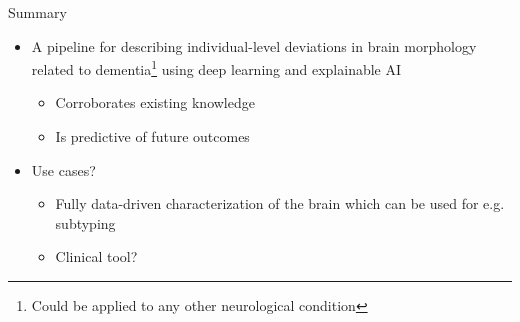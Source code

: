 \documentclass[t]{beamer}
\begin{document}





	\begin{frame}{Summary}
		\vfill
		\centering
		\begin{itemize}
			\item A pipeline for describing individual-level deviations in brain morphology related to dementia\footnote{Could be applied to any other neurological condition} using deep learning and explainable AI
			\begin{itemize}
				\item Corroborates existing knowledge
				\item Is predictive of future outcomes
			\end{itemize}
			\item Use cases?
			\begin{itemize}
				\item Fully data-driven characterization of the brain which can be used for e.g. subtyping
				\item Clinical tool?
			\end{itemize}
		\end{itemize}
		\vfill
	\end{frame}
\end{document}
